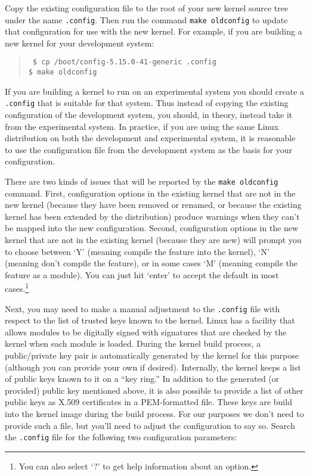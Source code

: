 \documentclass{article}
\newcommand{\command}[1]{\texttt{#1}}
\newcommand{\filename}[1]{\texttt{#1}}
\newenvironment{commands}
  {\begin{quote} \tt}
  {\end{quote}}
\begin{document}
Copy the existing configuration file to the root of your new kernel source tree under the name
\filename{.config}. Then run the command \command{make oldconfig} to update that configuration
for use with the new kernel. For example, if you are building a new kernel for your development
system:
\begin{commands}
  \$ cp /boot/config-5.15.0-41-generic .config \\
  \$ make oldconfig
\end{commands}

If you are building a kernel to run on an experimental system you should create a
\filename{.config} that is suitable for that system. Thus instead of copying the existing
configuration of the development system, you should, in theory, instead take it from the
experimental system. In practice, if you are using the same Linux distribution on both the
development and experimental system, it is reasonable to use the configuration file from the
development system as the basis for your configuration.

There are two kinds of issues that will be reported by the \command{make oldconfig} command.
First, configuration options in the existing kernel that are not in the new kernel (because they
have been removed or renamed, or because the existing kernel has been extended by the
distribution) produce warnings when they can't be mapped into the new configuration. Second,
configuration options in the new kernel that are not in the existing kernel (because they are
new) will prompt you to choose between `Y' (meaning compile the feature into the kernel), `N'
(meaning don't compile the feature), or in some cases `M' (meaning compile the feature as a
module). You can just hit `enter' to accept the default in most cases.\footnote{You can also
  select `?' to get help information about an option.}

Next, you may need to make a manual adjustment to the \filename{.config} file with respect to
the list of trusted keys known to the kernel. Linux has a facility that allows modules to be
digitally signed with signatures that are checked by the kernel when each module is loaded.
During the kernel build process, a public/private key pair is automatically generated by the
kernel for this purpose (although you can provide your own if desired). Internally, the kernel
keeps a list of public keys known to it on a ``key ring.'' In addition to the generated (or
provided) public key mentioned above, it is also possible to provide a list of other public keys
as X.509 certificates in a PEM-formatted file. These keys are build into the kernel image during
the build process. For our purposes we don't need to provide such a file, but you'll need to
adjust the configuration to say so. Search the \filename{.config} file for the following two
configuration parameters:
\end{document}
